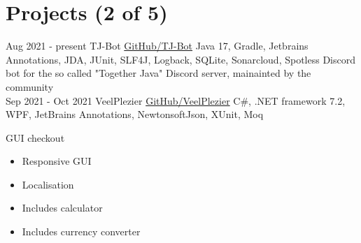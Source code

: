 \documentclass[letterpaper]{twentysecondcv} %
\begin{document}

\section{Projects (2 of 5)}
\begin{twenty} %
	\twentyitem
    		{Aug 2021 -}
		{present}
        		{TJ-Bot}
        		{\href{https://github.com/Together-Java/TJ-Bot/}{GitHub/TJ-Bot}}
        		{Java 17, Gradle, Jetbrains Annotations, JDA, JUnit, SLF4J, Logback, SQLite, Sonarcloud, Spotless}
        		{Discord bot for the so called "Together Java" Discord server, mainainted by the community}\\
	\twentyitem
    		{Sep 2021 -}
		{Oct 2021}
        		{VeelPlezier}
        		{\href{https://github.com/Tais993/VeelPlezier}{GitHub/VeelPlezier}}
        		{C\#, .NET framework 7.2, WPF, JetBrains Annotations, NewtonsoftJson, XUnit, Moq}
        		{
        		GUI checkout
        		\begin{itemize}
        			\item Responsive GUI
        			\item Localisation
        			\item Includes calculator
        			\item Includes currency converter
        		\end{itemize}}\\
\end{twenty}

\newpage

\makesidebarSecond %

\end{document}

